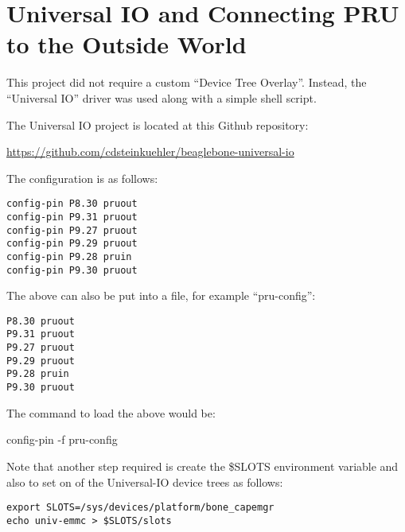%
%
%

\chapter{Universal IO and Connecting PRU to the Outside World}

This project did not require a custom ``Device Tree Overlay''.  Instead, the ``Universal IO'' driver was used along with a simple shell script.

The Universal IO project is located at this Github repository:

\url{https://github.com/cdsteinkuehler/beaglebone-universal-io}

The configuration is as follows:

\begin{verbatim}
config-pin P8.30 pruout
config-pin P9.31 pruout
config-pin P9.27 pruout
config-pin P9.29 pruout
config-pin P9.28 pruin
config-pin P9.30 pruout
\end{verbatim}

The above can also be put into a file, for example ``pru-config'':

\begin{verbatim}
P8.30 pruout
P9.31 pruout
P9.27 pruout
P9.29 pruout
P9.28 pruin
P9.30 pruout
\end{verbatim}

The command to load the above would be:

config-pin -f pru-config

Note that another step required is create the \$SLOTS environment variable
and also to set on of the Universal-IO device trees as follows:

\begin{verbatim}
export SLOTS=/sys/devices/platform/bone_capemgr
echo univ-emmc > $SLOTS/slots 
\end{verbatim}


